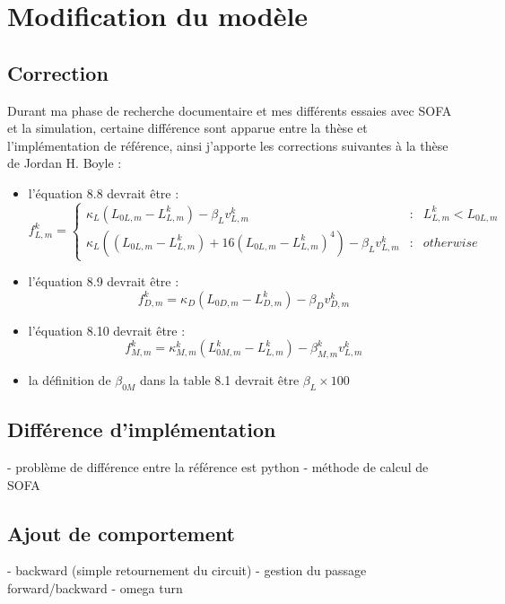 \chapter{Modification du modèle} %
\label{cha:Modification du modèle}

\section{Correction} %
\label{sec:Correction}

Durant ma phase de recherche documentaire et mes différents essaies avec
SOFA et la simulation, certaine différence sont apparue entre la thèse
et l'implémentation de référence, ainsi j'apporte les corrections suivantes
à la thèse de Jordan H. Boyle \cite{Boyle2009} :
\begin{itemize}
   \item l'équation 8.8 devrait être :
      \begin{equation}
      f^k_{L,m} = \left\{ 
         \begin{array}{rcl}
            \kappa_L(L_{0L,m} - L_{L,m}^k) - \beta_{L}v_{L,m}^k & : & L_{L,m}^k < L_{0L,m}\\
            \kappa_L((L_{0L,m} - L_{L,m}^k) + 16(L_{0L,m} - L_{L,m}^k)^4) - \beta_{L}v_{L,m}^k & : & otherwise
         \end{array}
         \right.
      \end{equation}
   \item l'équation 8.9 devrait être :
      \begin{equation}
      f_{D,m}^k = \kappa_D(L_{0D,m} - L_{D,m}^k) - \beta_{D}v_{D,m}^k
      \end{equation}
   \item l'équation 8.10 devrait être :
      \begin{equation}
      f_{M,m}^k = \kappa_{M,m}^k(L_{0M,m}^k - L_{L,m}^k) - \beta_{M,m}^{k}v_{L,m}^k
      \end{equation}
   \item la définition de $\beta_{0M}$ dans la table 8.1 devrait être $\beta_L \times 100$
\end{itemize}


\section{Différence d'implémentation} %
\label{sec:Différence d'implémentation}

- problème de différence entre la référence est python
- méthode de calcul de SOFA


\section{Ajout de comportement} %
\label{sec:Ajout de comportement}

- backward (simple retournement du circuit)
  - gestion du passage forward/backward
- omega turn


